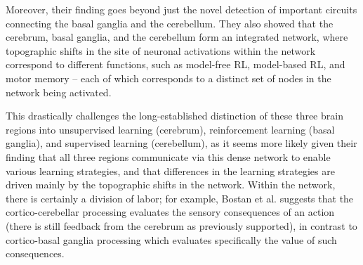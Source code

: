 \begin{center}
\begin{tcolorbox}[breakable,sharp corners=all,coltitle=black,colbacktitle=white,
    width=\textwidth,boxsep=5pt,left=5pt,right=5pt,
    title={\textbf{Box D: }}]
Moreover, their finding goes beyond just the novel detection of important circuits connecting the basal ganglia and the cerebellum. They also showed that the cerebrum, basal ganglia, and the cerebellum form an integrated network, where topographic shifts in the site of neuronal activations within the network correspond to different functions, such as model-free RL, model-based RL, and motor memory -- each of which corresponds to a distinct set of nodes in the network being activated. 

This drastically challenges the long-established distinction of these three brain regions into unsupervised learning (cerebrum), reinforcement learning (basal ganglia), and supervised learning (cerebellum), as it seems more likely given their finding that all three regions communicate via this dense network to enable various learning strategies, and that differences in the learning strategies are driven mainly by the topographic shifts in the network. Within the network, there is certainly a division of labor; for example, Bostan et al. suggests that the cortico-cerebellar processing evaluates the sensory consequences of an action (there is still feedback from the cerebrum as previously supported), in contrast to cortico-basal ganglia processing which evaluates specifically the value of such consequences.

  \end{tcolorbox}
\end{center}